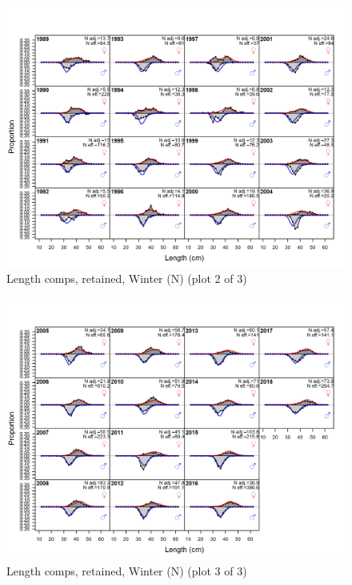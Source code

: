 \documentclass[12pt,]{article}
\begin{document}
\begin{figure}
\centering
\includegraphics{r4ss/plots_mod1/comp_lenfit_flt1mkt2_page2.png}
\caption{Length comps, retained, Winter (N) (plot 2 of 3)
\label{fig:length_fits}}
\end{figure}

\begin{figure}
\centering
\includegraphics{r4ss/plots_mod1/comp_lenfit_flt1mkt2_page3.png}
\caption{Length comps, retained, Winter (N) (plot 3 of 3)
\label{fig:length_fits}}
\end{figure}
\end{document}
